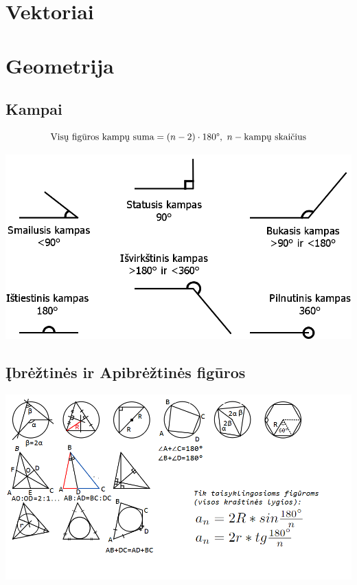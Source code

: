 \documentclass[fleqn]{article} %
\begin{document}
\section{Vektoriai}

% 

\section{Geometrija}

\subsection{Kampai}

\begin{equation}
    \text{Visų figūros kampų suma} = (n - 2) \cdot 180\degree,\ n - \text{kampų skaičius}
\end{equation}

\includegraphics[max width=\textwidth]{assets/angle_types.png}

\subsection{Įbrėžtinės ir Apibrėžtinės figūros}

\includegraphics[max width = \textwidth]{assets/geometry.png}
\end{document}
